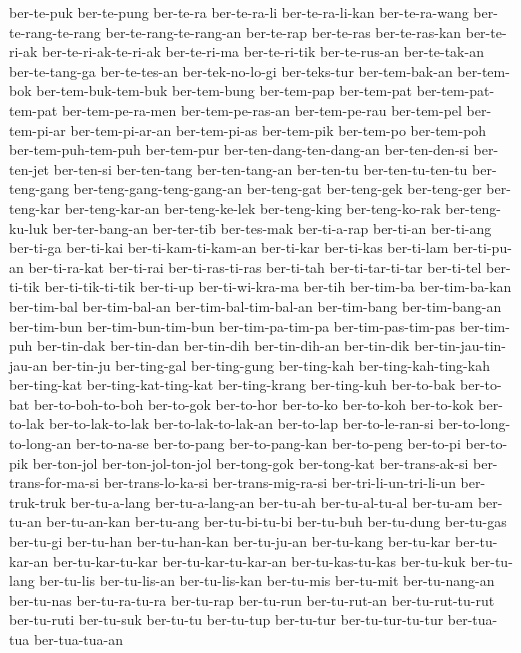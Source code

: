 {ber-te-puk ber-te-pung ber-te-ra ber-te-ra-li ber-te-ra-li-kan
ber-te-ra-wang ber-te-rang-te-rang ber-te-rang-te-rang-an ber-te-rap
ber-te-ras ber-te-ras-kan ber-te-ri-ak ber-te-ri-ak-te-ri-ak ber-te-ri-ma
ber-te-ri-tik ber-te-rus-an ber-te-tak-an ber-te-tang-ga ber-te-tes-an
ber-tek-no-lo-gi ber-teks-tur ber-tem-bak-an ber-tem-bok
ber-tem-buk-tem-buk ber-tem-bung ber-tem-pap ber-tem-pat
ber-tem-pat-tem-pat ber-tem-pe-ra-men ber-tem-pe-ras-an ber-tem-pe-rau
ber-tem-pel ber-tem-pi-ar ber-tem-pi-ar-an ber-tem-pi-as ber-tem-pik
ber-tem-po ber-tem-poh ber-tem-puh-tem-puh ber-tem-pur
ber-ten-dang-ten-dang-an ber-ten-den-si ber-ten-jet ber-ten-si
ber-ten-tang ber-ten-tang-an ber-ten-tu ber-ten-tu-ten-tu ber-teng-gang
ber-teng-gang-teng-gang-an ber-teng-gat ber-teng-gek ber-teng-ger
ber-teng-kar ber-teng-kar-an ber-teng-ke-lek ber-teng-king ber-teng-ko-rak
ber-teng-ku-luk ber-ter-bang-an ber-ter-tib ber-tes-mak ber-ti-a-rap
ber-ti-an ber-ti-ang ber-ti-ga ber-ti-kai ber-ti-kam-ti-kam-an ber-ti-kar
ber-ti-kas ber-ti-lam ber-ti-pu-an ber-ti-ra-kat ber-ti-rai
ber-ti-ras-ti-ras ber-ti-tah ber-ti-tar-ti-tar ber-ti-tel ber-ti-tik
ber-ti-tik-ti-tik ber-ti-up ber-ti-wi-kra-ma ber-tih ber-tim-ba
ber-tim-ba-kan ber-tim-bal ber-tim-bal-an ber-tim-bal-tim-bal-an
ber-tim-bang ber-tim-bang-an ber-tim-bun ber-tim-bun-tim-bun
ber-tim-pa-tim-pa ber-tim-pas-tim-pas ber-tim-puh ber-tin-dak ber-tin-dan
ber-tin-dih ber-tin-dih-an ber-tin-dik ber-tin-jau-tin-jau-an ber-tin-ju
ber-ting-gal ber-ting-gung ber-ting-kah ber-ting-kah-ting-kah ber-ting-kat
ber-ting-kat-ting-kat ber-ting-krang ber-ting-kuh ber-to-bak ber-to-bat
ber-to-boh-to-boh ber-to-gok ber-to-hor ber-to-ko ber-to-koh ber-to-kok
ber-to-lak ber-to-lak-to-lak ber-to-lak-to-lak-an ber-to-lap
ber-to-le-ran-si ber-to-long-to-long-an ber-to-na-se ber-to-pang
ber-to-pang-kan ber-to-peng ber-to-pi ber-to-pik ber-ton-jol
ber-ton-jol-ton-jol ber-tong-gok ber-tong-kat ber-trans-ak-si
ber-trans-for-ma-si ber-trans-lo-ka-si ber-trans-mig-ra-si
ber-tri-li-un-tri-li-un ber-truk-truk ber-tu-a-lang ber-tu-a-lang-an
ber-tu-ah ber-tu-al-tu-al ber-tu-am ber-tu-an ber-tu-an-kan ber-tu-ang
ber-tu-bi-tu-bi ber-tu-buh ber-tu-dung ber-tu-gas ber-tu-gi ber-tu-han
ber-tu-han-kan ber-tu-ju-an ber-tu-kang ber-tu-kar ber-tu-kar-an
ber-tu-kar-tu-kar ber-tu-kar-tu-kar-an ber-tu-kas-tu-kas ber-tu-kuk
ber-tu-lang ber-tu-lis ber-tu-lis-an ber-tu-lis-kan ber-tu-mis ber-tu-mit
ber-tu-nang-an ber-tu-nas ber-tu-ra-tu-ra ber-tu-rap ber-tu-run
ber-tu-rut-an ber-tu-rut-tu-rut ber-tu-ruti ber-tu-suk ber-tu-tu
ber-tu-tup ber-tu-tur ber-tu-tur-tu-tur ber-tua-tua ber-tua-tua-an
}
